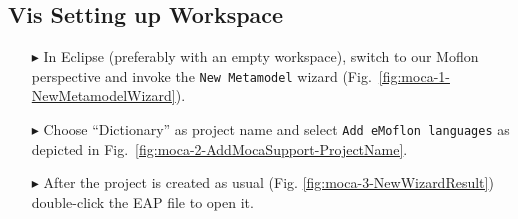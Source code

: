 \newpage
\subsection{Vis Setting up Workspace}
\visHeader

\begin{enumerate}
\item[$\blacktriangleright$] In Eclipse (preferably with an empty workspace), switch to our Moflon perspective and invoke the \texttt{New Metamodel} wizard
(Fig.~\ref{fig:moca-1-NewMetamodelWizard}).


\item[$\blacktriangleright$] Choose ``Dictionary'' as project name and select \texttt{Add eMoflon languages} as depicted in Fig.~\ref{fig:moca-2-AddMocaSupport-ProjectName}. 


\item[$\blacktriangleright$] After the project is created as usual (Fig. \ref{fig:moca-3-NewWizardResult}) double-click the EAP file to open it. 



\end{enumerate}
